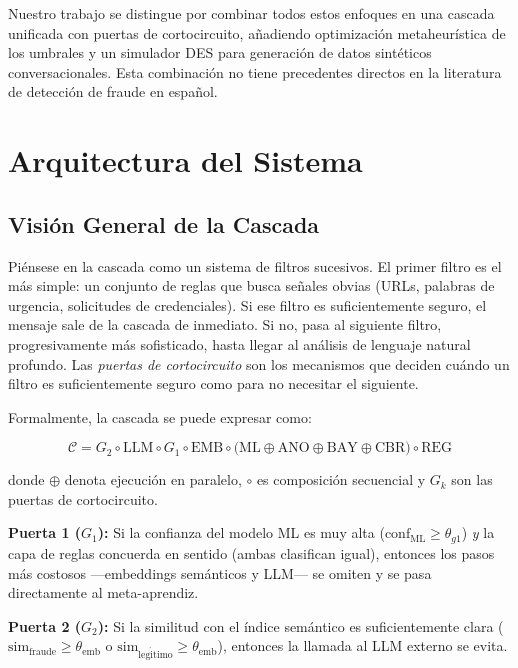 \documentclass{llncs}
\begin{document}
Nuestro trabajo se distingue por combinar todos estos enfoques
en una cascada unificada con puertas de cortocircuito, añadiendo
optimización metaheurística de los umbrales y un simulador DES
para generación de datos sintéticos conversacionales.
Esta combinación no tiene precedentes directos en la literatura
de detección de fraude en español.

\section{Arquitectura del Sistema}
\label{sec:arch}

\subsection{Visión General de la Cascada}
\label{sec:arch:cascade}

Piénsese en la cascada como un sistema de filtros sucesivos.
El primer filtro es el más simple: un conjunto de reglas que
busca señales obvias (URLs, palabras de urgencia, solicitudes
de credenciales).
Si ese filtro es suficientemente seguro, el mensaje sale de la
cascada de inmediato.
Si no, pasa al siguiente filtro, progresivamente más sofisticado,
hasta llegar al análisis de lenguaje natural profundo.
Las \emph{puertas de cortocircuito} son los mecanismos que deciden
cuándo un filtro es suficientemente seguro como para no necesitar
el siguiente.

Formalmente, la cascada se puede expresar como:

\begin{equation}
  \mathcal{C} = G_2 \circ \mathrm{LLM} \circ G_1 \circ \mathrm{EMB}
    \circ \bigl(\mathrm{ML} \oplus \mathrm{ANO} \oplus \mathrm{BAY}
    \oplus \mathrm{CBR}\bigr) \circ \mathrm{REG}
  \label{eq:cascade}
\end{equation}

donde $\oplus$ denota ejecución en paralelo, $\circ$ es composición
secuencial y $G_k$ son las puertas de cortocircuito.

\textbf{Puerta 1 ($G_1$):}
Si la confianza del modelo ML es muy alta
($\mathrm{conf}_{\mathrm{ML}} \geq \theta_{g1}$)
\emph{y} la capa de reglas concuerda en sentido (ambas clasifican igual),
entonces los pasos más costosos —embeddings semánticos y LLM—
se omiten y se pasa directamente al meta-aprendiz.

\textbf{Puerta 2 ($G_2$):}
Si la similitud con el índice semántico es suficientemente clara
($\mathrm{sim}_{\mathrm{fraude}} \geq \theta_{\mathrm{emb}}$
o $\mathrm{sim}_{\mathrm{leg\acute{i}timo}} \geq \theta_{\mathrm{emb}}$),
entonces la llamada al LLM externo se evita.
\end{document}
